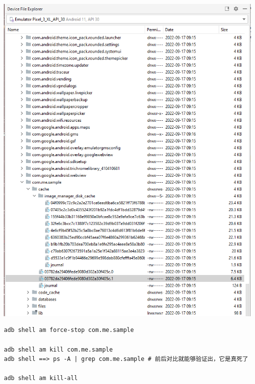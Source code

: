 \documentclass[9pt, b5paper]{article}
\begin{document}
\includegraphics[width=.9\linewidth]{./pic/readme_20220917_093017.png}
\begin{verbatim}
adb shell am force-stop com.me.sample 

adb shell am kill com.me.sample 
adb shell ==> ps -A | grep com.me.sample # 前后对比就能够验证出，它是真死了

adb shell am kill-all 　　　　　　　　　　　　　
\end{verbatim}
\end{document}
